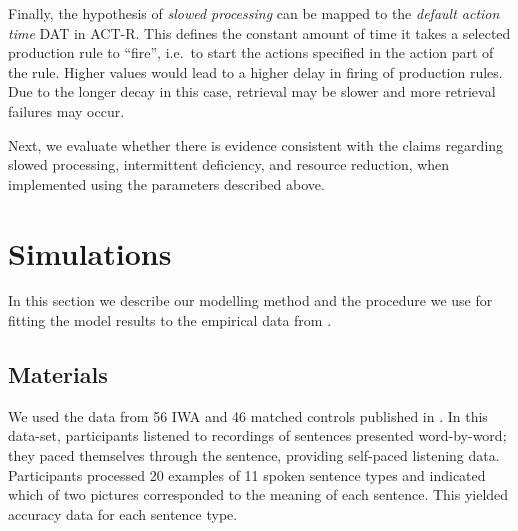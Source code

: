 \documentclass[10pt,letterpaper]{article}
\begin{document}
Finally, the hypothesis of \emph{slowed processing} can be mapped to the \emph{default action time} DAT in ACT-R. This defines the constant amount of time it takes a selected production rule to ``fire'', i.e.\ to start the actions specified in the action part of the rule. Higher values would lead to a higher delay in firing of production rules. Due to the longer decay in this case, retrieval may be slower and more retrieval failures may occur.

Next, we evaluate whether there is evidence consistent with the claims regarding slowed processing, intermittent deficiency, and resource reduction, when implemented using the parameters described above. 

\section{Simulations}

In this section we describe our modelling method and the procedure we use for fitting the model results to the empirical data from .

\subsection{Materials}

We used the data from 56 IWA and 46 matched controls published in . In this data-set, participants listened to recordings of sentences presented word-by-word; they paced themselves through the sentence, providing self-paced listening data. Participants processed 20 examples of 11 spoken sentence types and indicated which of two pictures corresponded to the meaning of each sentence. This yielded accuracy data for each sentence type. 
\end{document}
